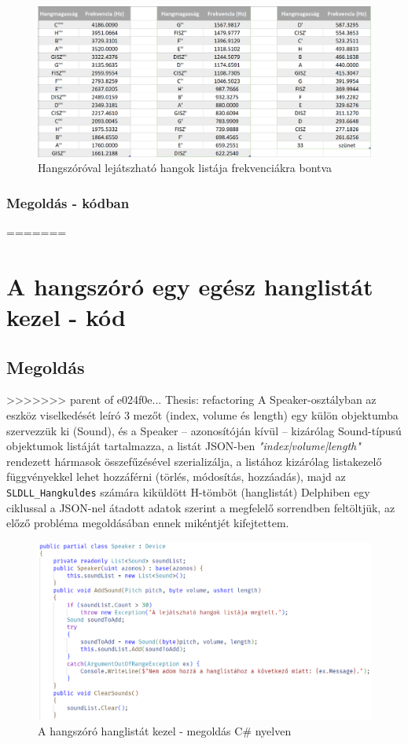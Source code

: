 \documentclass[tocnopagenum]{thesis-ekf}
\theoremstyle{definition}
\theoremstyle{remark}
\begin{document}
	\begin{figure}[h!]
	\centering
	\includegraphics[scale=0.7]{frequencies}
	\caption{Hangszóróval lejátszható hangok listája frekvenciákra bontva}
	\label{fig:frequencies}
	\end{figure}

	\subsubsection{Megoldás - kódban}
=======
	\section{A hangszóró egy egész hanglistát kezel - kód}
	\subsection{Megoldás}
>>>>>>> parent of e024f0e... Thesis: refactoring
	A Speaker-osztályban az eszköz viselkedését leíró 3 mezőt (index, volume és length) egy külön objektumba szervezzük ki (Sound), és a Speaker -- azonosítóján kívül -- kizárólag Sound-típusú objektumok listáját tartalmazza, a listát JSON-ben \textit{"index|volume|length"} rendezett hármasok összefűzésével szerializálja, a listához kizárólag listakezelő függvényekkel lehet hozzáférni (törlés, módosítás, hozzáadás), majd az \verb*|SLDLL_Hangkuldes| számára kiküldött H-tömböt (hanglistát) Delphiben egy ciklussal a JSON-nel átadott adatok szerint a megfelelő sorrendben feltöltjük, az előző probléma megoldásában ennek mikéntjét kifejtettem.
	\begin{figure}[h!]
		\centering
		\includegraphics[scale=0.7]{speaker_csharp}
		\caption{A hangszóró hanglistát kezel - megoldás C\# nyelven}
		\label{speaker_csharp}
	\end{figure}
\end{document}
